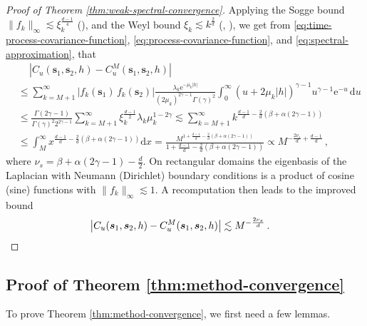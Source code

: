\documentclass[12pt]{article} %
\newcommand{\dint}{\text{d}}
\begin{document}
\begin{proof}[Proof of Theorem \ref{thm:weak-spectral-convergence}]

Applying the Sogge bound $\|f_k\|_\infty \lesssim \xi_k^{\frac{d-1}{4}}$ (\cite{Sogge1988, Smith2007}), and the Weyl bound $\xi_k \lesssim k^{\frac{2}{d}}$ (\cite{davies1995}, \cite{Lablee2015-pi}),  we get from \eqref{eq:time-process-covariance-function}, \eqref{eq:process-covariance-function}, and \eqref{eq:spectral-approximation}, that 
\begin{align*}
& \, \quad \left| C_{u}(\boldsymbol{s}_1, \boldsymbol{s}_2, h) - C^M_{u}(\boldsymbol{s}_1, \boldsymbol{s}_2, h)\right| \\
&\leq \sum_{k = M + 1}^\infty \left|f_k(\boldsymbol{s}_1)\,f_k(\boldsymbol{s}_2) \right| \frac{\lambda_k \mathrm{e}^{-\mu_k |h|}}{(2 \mu_k)^{2 \gamma - 1} \Gamma(\gamma)^2} \int_0^\infty (u + 2 \mu_k |h|)^{\gamma - 1} u^{\gamma - 1} \mathrm{e}^{-u} \, \mathrm{d}u \\
& \leq \frac{\Gamma(2 \gamma - 1)}{\Gamma(\gamma)^2 2^{2 \gamma - 1}} \sum_{k = M + 1}^\infty \xi_k^{\frac{d - 1}{2}} \lambda_k \mu_k^{1 - 2\gamma} \lesssim \sum_{k = M + 1}^\infty k^{\frac{d - 1}{d} - \frac{2}{d}(\beta + \alpha (2\gamma - 1))} \\
& \leq \int_{M}^\infty x^{\frac{d - 1}{d} - \frac{2}{d}(\beta + \alpha (2\gamma - 1))} \dint x = \frac{M^{1 + \frac{d - 1}{d} - \frac{2}{d}(\beta + \alpha (2\gamma - 1))}}{1 + \frac{d - 1}{d} - \frac{2}{d}(\beta + \alpha (2\gamma - 1))} \propto M^{-\frac{2 \nu_s}{d} + \frac{d - 1}{d}} \,,
\end{align*}
where $\nu_s = \beta + \alpha (2\gamma - 1) - \frac{d}{2}$. On rectangular domains the eigenbasis of the Laplacian with Neumann (Dirichlet) boundary conditions is a product of cosine (sine) functions  with 
$\|f_k\|_\infty \lesssim 1$. A recomputation then leads to  the improved bound
\begin{align*}
\left| C_{u}(\boldsymbol{s}_1, \boldsymbol{s}_2, h) - C^M_{u}(\boldsymbol{s}_1, \boldsymbol{s}_2, h)\right| &\lesssim M^{-\frac{2 \nu_s}{d}} \, . \qedhere
\end{align*}
\end{proof}

\subsection{Proof of Theorem \ref{thm:method-convergence}} \label{suppl:proof-thm-2}

To prove Theorem \ref{thm:method-convergence}, we first need a few lemmas.
\end{document}
